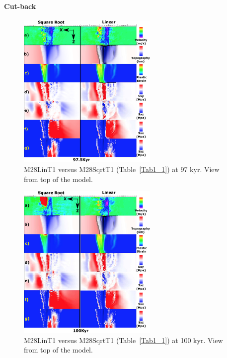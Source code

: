 \paragraph{Cut-back}\label{para_CutBack}

\begin{figure}[h]
  \centering
    \includegraphics[width=0.6\textwidth]{./Figures/fig_Results4_3_sqrt_vs_lin_cut_back_97kyr.eps}
  \caption{M28LinT1 versus M28SqrtT1 (Table~\hyperref[Tab1_1]{\ref{Tab1_1}}) at 97 kyr. View from top of the model.}
 \label{fig_Results4_3_1}
\end{figure}  

\begin{figure}[h]
  \centering
    \includegraphics[width=0.6\textwidth]{./Figures/fig_Results4_3_sqrt_vs_lin_cut_back_100kyr.eps}
  \caption{M28LinT1 versus M28SqrtT1 (Table~\hyperref[Tab1_1]{\ref{Tab1_1}}) at 100 kyr. View from top of the model.}
 \label{fig_Results4_3_2}
\end{figure} 

